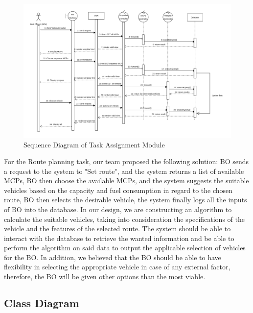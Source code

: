 \documentclass[a4paper, 13pt]{article}
\begin{document}
\begin{center}
    \begin{figure}[!ht]
        \centering
        \includegraphics[scale=0.5]{system-modeling/diagramSequence.png}
        \caption{Sequence Diagram of Task Assignment Module}
        \label{fig:my_label}
    \end{figure}
\end{center}
\begin{tcolorbox}[colback=blue!5!white,colframe=blue!75!black]
For the Route planning task, our team proposed the following solution:
BO sends a request to the system to "Set route", and the system returns a list of available MCPs, BO then choose the available MCPs, and the system suggests the suitable vehicles based on the capacity and fuel consumption in regard to the chosen route, BO then selects the desirable vehicle, the system finally logs all the inputs of BO into the database. In our design, we are constructing an algorithm to calculate the suitable vehicles, taking into consideration the specifications of the vehicle and the features of the selected route. The system should be able to interact with the database to retrieve the wanted information and be able to perform the algorithm on said data to output the applicable selection of vehicles for the BO. In addition, we believed that the BO should be able to have flexibility in selecting the appropriate vehicle in case of any external factor, therefore, the BO will be given other options than the most viable.
\end{tcolorbox}
\newpage
\subsection{Class Diagram}
\end{document}
